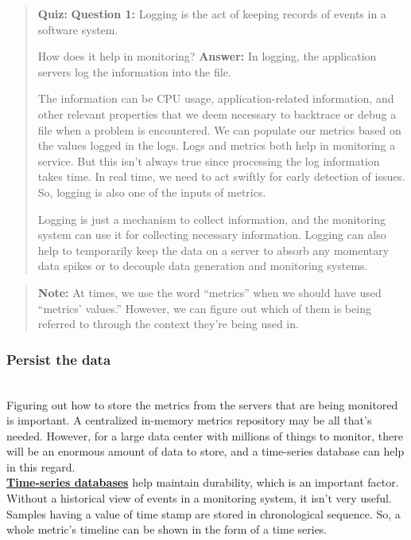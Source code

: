 \begin{quote}
\textbf{Quiz:}
\textbf{Question 1:} Logging is the act of keeping records of events in a software system.

How does it help in monitoring?
\textbf{Answer:} In logging, the application servers log the information into the file.

The information can be CPU usage, application-related information, and other relevant properties that we deem necessary to backtrace or debug a file when a problem is encountered. We can populate our metrics based on the values logged in the logs. Logs and metrics both help in monitoring a service. But this isn't always true since processing the log information takes time. In real time, we need to act swiftly for early detection of issues. So, logging is also one of the inputs of metrics.

Logging is just a mechanism to collect information, and the monitoring system can use it for collecting necessary information. Logging can also help to temporarily keep the data on a server to absorb any momentary data spikes or to decouple data generation and monitoring systems.
\end{quote}

\begin{quote}
\textbf{Note:} At times, we use the word ``metrics'' when we should have used ``metrics' values.'' However, we can figure out which of them is being referred to through the context they're being used in.
\end{quote}
\subsubsection{Persist the data}\label{AkWj8OW3CcDZyZE0I-m-l}
\\
Figuring out how to store the metrics from the servers that are being monitored is important. A centralized in-memory metrics repository may be all that's needed. However, for a large data center with millions of things to monitor, there will be an enormous amount of data to store, and a time-series database can help in this regard.
\\
\href{https://www.educative.io/answers/what-is-a-time-series-database}{\textbf{Time-series databases}} help maintain durability, which is an important factor. Without a historical view of events in a monitoring system, it isn't very useful. Samples having a value of time stamp are stored in chronological sequence. So, a whole metric's timeline can be shown in the form of a time series.

